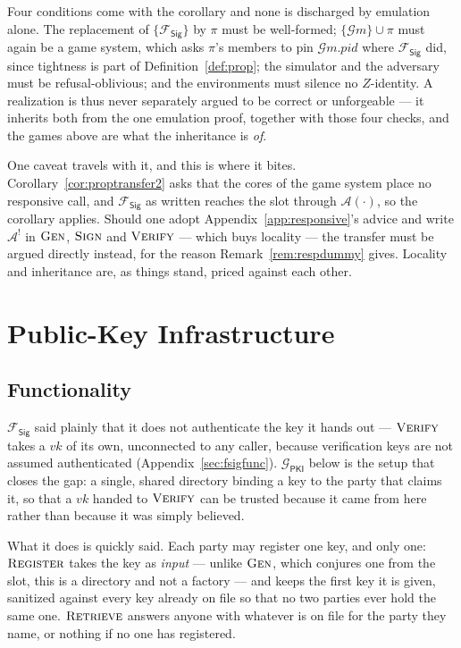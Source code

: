 \documentclass[11pt,a4paper]{article}
\newcommand{\PID}{\mathit{pid}}
\newcommand{\Adv}{\mathcal{A}}
\newcommand{\op}[1]{\textsc{#1}}
\newcommand{\Gm}{\mathcal{G}m}
\newcommand{\Fsig}{\mathcal{F}_{\mathsf{Sig}}}
\newcommand{\Gpki}{\mathcal{G}_{\mathsf{PKI}}}
\newcommand{\vk}{\mathit{vk}}
\theoremstyle{accentdef}
\theoremstyle{accentplain}
\begin{document}
Four conditions come with the corollary and none is discharged by emulation alone. The replacement of
$\{\Fsig\}$ by $\pi$ must be well-formed; $\{\Gm\} \cup \pi$ must again be a game system, which asks
$\pi$'s members to pin $\Gm.\PID$ where $\Fsig$ did, since tightness is part of
Definition~\ref{def:prop}; the simulator and the adversary must be refusal-oblivious; and the
environments must silence no $Z$-identity. A realization is thus never separately argued to be correct
or unforgeable --- it inherits both from the one emulation proof, together with those four checks, and
the games above are what the inheritance is \emph{of}.

One caveat travels with it, and this is where it bites. Corollary~\ref{cor:proptransfer2} asks that
the cores of the game system place no responsive call, and $\Fsig$ as written reaches the slot through
$\Adv(\cdot)$, so the corollary applies. Should one adopt Appendix~\ref{app:responsive}'s advice and
write $\Adv^{!}$ in $\op{Gen}$, $\op{Sign}$ and $\op{Verify}$ --- which buys locality --- the transfer
must be argued directly instead, for the reason Remark~\ref{rem:respdummy} gives. Locality and
inheritance are, as things stand, priced against each other.

\section{Public-Key Infrastructure}\label{sec:pki}

\subsection{Functionality}\label{sec:pkifunc}

$\Fsig$ said plainly that it does not authenticate the key it hands out --- $\op{Verify}$ takes a
$\vk$ of its own, unconnected to any caller, because verification keys are not assumed
authenticated (Appendix~\ref{sec:fsigfunc}). $\Gpki$ below is the setup that closes the gap: a
single, shared directory binding a key to the party that claims it, so that a $\vk$ handed to
$\op{Verify}$ can be trusted because it came from here rather than because it was simply believed.

What it does is quickly said. Each party may register one key, and only one: $\op{Register}$
takes the key as \emph{input} --- unlike $\op{Gen}$, which conjures one from the slot, this is a
directory and not a factory --- and keeps the first key it is given, sanitized against every key
already on file so that no two parties ever hold the same one. $\op{Retrieve}$ answers anyone with
whatever is on file for the party they name, or nothing if no one has registered.
\end{document}
